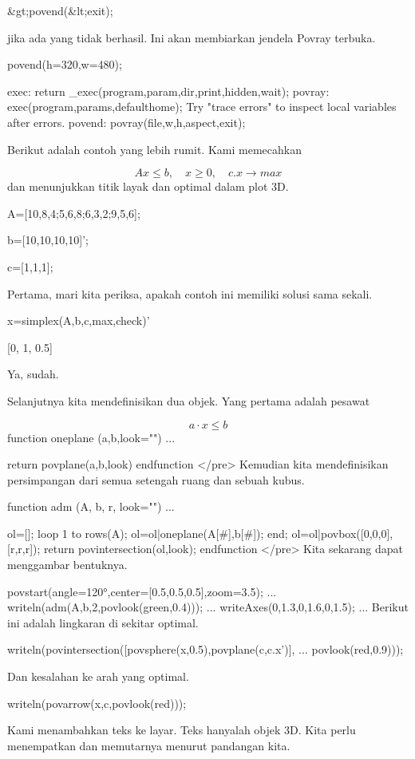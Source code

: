 \documentclass{article}
\begin{document}
  &gt;povend(&lt;exit);  

jika ada yang tidak berhasil. Ini akan membiarkan jendela Povray
terbuka.


\>povend(h=320,w=480);


    exec:
        return _exec(program,param,dir,print,hidden,wait);
    povray:
        exec(program,params,defaulthome);
    Try "trace errors" to inspect local variables after errors.
    povend:
        povray(file,w,h,aspect,exit); 

Berikut adalah contoh yang lebih rumit. Kami memecahkan


$$Ax \le b, \quad x \ge 0, \quad c.x \to max$$dan menunjukkan titik layak dan optimal dalam plot 3D.


\>A=[10,8,4;5,6,8;6,3,2;9,5,6];

\>b=[10,10,10,10]';

\>c=[1,1,1];


Pertama, mari kita periksa, apakah contoh ini memiliki solusi sama
sekali.


\>x=simplex(A,b,c,\>max,\>check)'


    [0,  1,  0.5]

Ya, sudah.


Selanjutnya kita mendefinisikan dua objek. Yang pertama adalah pesawat


$$a \cdot x \le b$$\>function oneplane (a,b,look="") ...


      return povplane(a,b,look)
    endfunction
</pre>
Kemudian kita mendefinisikan persimpangan dari semua setengah ruang
dan sebuah kubus.


\>function adm (A, b, r, look="") ...


      ol=[];
      loop 1 to rows(A); ol=ol|oneplane(A[#],b[#]); end;
      ol=ol|povbox([0,0,0],[r,r,r]);
      return povintersection(ol,look);
    endfunction
</pre>
Kita sekarang dapat menggambar bentuknya.


\>povstart(angle=120°,center=[0.5,0.5,0.5],zoom=3.5); ...  
\>   writeln(adm(A,b,2,povlook(green,0.4))); ...  
\>   writeAxes(0,1.3,0,1.6,0,1.5); ...  
\>  
Berikut ini adalah lingkaran di sekitar optimal.


\>writeln(povintersection([povsphere(x,0.5),povplane(c,c.x')], ...  
\>     povlook(red,0.9)));


Dan kesalahan ke arah yang optimal.


\>writeln(povarrow(x,c,povlook(red)));


Kami menambahkan teks ke layar. Teks hanyalah objek 3D. Kita perlu
menempatkan dan memutarnya menurut pandangan kita.
\end{document}
